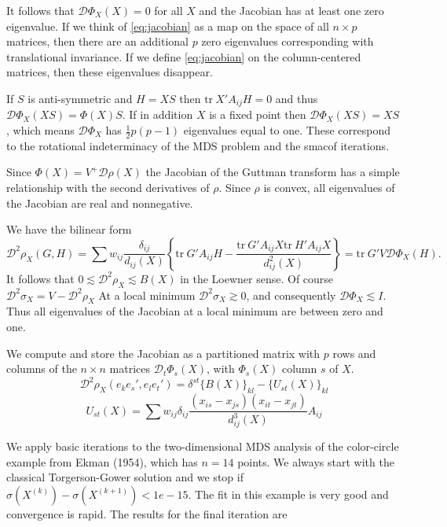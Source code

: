 \documentclass[
  12pt,
]{article}
\begin{document}
It follows that \(\mathcal{D}\Phi_X(X)=0\) for all \(X\) and the Jacobian has at least one
zero eigenvalue. If we think of \eqref{eq:jacobian} as a map on the space
of all \(n\times p\) matrices, then there are an additional \(p\) zero eigenvalues
corresponding with translational invariance. If we define \eqref{eq:jacobian}
on the column-centered matrices, then these eigenvalues disappear.

If \(S\) is anti-symmetric and
\(H=XS\) then \(\text{tr}\ X'A_{ij}H=0\) and thus \(\mathcal{D}\Phi_X(XS)=\Phi(X)S\).
If in addition \(X\) is a fixed point then \(\mathcal{D}\Phi_X(XS)=XS\),
which means \(\mathcal{D}\Phi_X\) has \(\frac12p(p-1)\) eigenvalues equal to one.
These correspond to the rotational indeterminacy of the MDS problem and the
smacof iterations.

Since \(\Phi(X)=V^+\mathcal{D}\rho(X)\) the Jacobian of the Guttman transform
has a simple relationship with the second derivatives of \(\rho\). Since
\(\rho\) is convex, all eigenvalues of the Jacobian are real and
nonnegative.

We have the bilinear form
\begin{equation}
\mathcal{D}^2\rho_X(G,H)=\sum w_{ij}\frac{\delta_{ij}}{d_{ij}(X)}\left\{\text{tr}\ G'A_{ij}H-\frac{\text{tr}\ G'A_{ij}X\text{tr}\ H'A_{ij}X}{d_{ij}^2(X)}\right\}=\text{tr}\ G'V\mathcal{D}\Phi_X(H).
\label{eq:hessian}
\end{equation}
It follows that
\(0\lesssim\mathcal{D}^2\rho_X\lesssim B(X)\)
in the Loewner sense. Of course
\(\mathcal{D}^2\sigma_X=V-\mathcal{D}^2\rho_X\)
At a local minimum \(\mathcal{D}^2\sigma_X\gtrsim 0\), and consequently
\(\mathcal{D}\Phi_X\lesssim I\). Thus all eigenvalues of the Jacobian at a local minimum are between zero and one.

We compute and store the Jacobian as a partitioned matrix with \(p\) rows and columns
of the \(n\times n\) matrices \(\mathcal{D}_t\Phi_s(X)\), with \(\Phi_s(X)\) column
\(s\) of \(X\).
\[
\mathcal{D}^2\rho_X(e_ke_s',e_le_t')=
\delta^{st}\{B(X)\}_{kl}-\{U_{st}(X)\}_{kl}
\]
\[
U_{st}(X)=\sum w_{ij}\delta_{ij}\frac{(x_{is}-x_{js})(x_{it}-x_{jt})}{d_{ij}^3(X)}A_{ij}
\]

We apply basic iterations to the two-dimensional MDS analysis of the color-circle example from Ekman (1954), which has
\(n=14\) points. We always start with the classical Torgerson-Gower
solution and we stop if
\(\sigma(X^{(k)})-\sigma(X^{(k+1)})<1e-15\). The fit in this example is very good and convergence is rapid. The
results for the final iteration are
\end{document}
